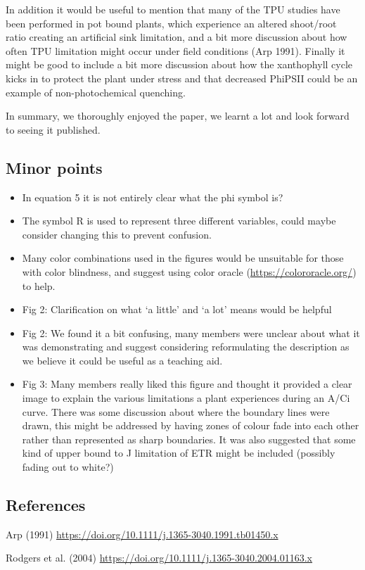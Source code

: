 \documentclass[10pt]{article}
\providecommand{\tightlist}{\setlength{\itemsep}{0pt}\setlength{\parskip}{0pt}}%
\begin{document}
\par\null

In addition it would be useful to mention that many of the TPU studies
have been performed in pot bound plants, which experience an altered
shoot/root ratio creating an artificial sink limitation, and a bit more
discussion about how often TPU limitation might occur under field
conditions (Arp 1991). Finally it might be good to include a bit more
discussion about how the xanthophyll cycle kicks in to protect the plant
under stress and that decreased PhiPSII could be an example of
non-photochemical quenching.

\par\null

In summary, we thoroughly enjoyed the paper, we learnt a lot and look
forward to seeing it published.

\subsubsection*{}

\subsection*{Minor points}

{\label{493224}}

\begin{itemize}
\tightlist
\item
  In equation 5 it is not entirely clear what the phi symbol is? ~
\item
  The symbol R is used to represent three different variables, could
  maybe consider changing this to prevent confusion.
\item
  Many color combinations used in the figures would be unsuitable for
  those with color blindness, and suggest using color oracle
  (\url{https://colororacle.org/}) to help.
\item
  Fig 2: Clarification on what `a little' and `a lot' means would be
  helpful
\item
  Fig 2: We found it a bit confusing, many members were unclear about
  what it was demonstrating and suggest considering reformulating the
  description as we believe it could be useful as a teaching aid.
\item
  Fig 3: Many members really liked this figure and thought it provided a
  clear image to explain the various limitations a plant experiences
  during an A/Ci curve. There was some discussion about where the
  boundary lines were drawn, this might be addressed by having zones of
  colour fade into each other rather than represented as sharp
  boundaries. It was also suggested that some kind of upper bound to J
  limitation of ETR might be included (possibly fading out to white?)
\end{itemize}

\subsection*{References}

{\label{362547}}

Arp (1991) \url{https://doi.org/10.1111/j.1365-3040.1991.tb01450.x}

Rodgers et al. (2004)
\url{https://doi.org/10.1111/j.1365-3040.2004.01163.x}

\FloatBarrier
\end{document}
